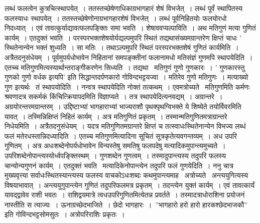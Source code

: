 \documentclass[11pt, openany]{book}
\begin{document}
\newpage
\thispagestyle{fancy}
\fancyhf{}
\noindent
लब्धं फलत्वेन कुत्रचित्स्थापयेत्~। ततस्तच्छेषेणाधिकाग्रभागहारं शेषं विभजेत्~। लब्धं पूर्वं स्थापितस्य फलस्याधः स्थापयेत्~। ततस्तच्छेषेणोनाग्रभागहारशेषं विभजेत्~। लब्धं पूर्वनिहितयोः फलयोरधो निदध्यात्~। एवं तावत्कुर्याद्यावत्फलपङ्क्तिः समा भवति~। शेषाववप्यल्पाविति~। अथ मतिगुणं मत्या गुणितं कार्यम्~। एतदुक्तं भवति~। परस्परभक्तशेषयोर्यद्यल्पमुपरि स्थितं तद्यथासंख्यमग्रान्तरेण क्षिप्तं चाधः ' स्थितेनान्येन भक्तं शुध्यति~। सा मतिः~। तथाऽल्पमुपरि स्थितं परस्परभक्तशेषं गुणितं कार्यमिति~। अत्रैतदनुसंधेयम्~। पूर्वमुपर्यधोभावेन निहितानां समपङ्क्तीनां फलानामधो मतिसंज्ञं गुणमपि स्थापयेदिति~। एतच्च मतिगुणमित्यस्यार्थान्तराङ्गीकरणेन सिध्यति~। तद्यथा \textendash \ मतिगुणं गुणो गुणकारः~। ' गुणकारस्तु गुणको गुणो वर्धक इत्यपि' इति सिद्धान्तदर्पणकारो गोविन्दभट्टयज्वा~। मतिरेव गुणो मतिगुणः~। मत्याख्यो गुण इत्यर्थः \textendash\  तं स्थापयोदिति~। नन्वत्र स्थापयेदिति नोक्तं तत्कथम्~। एवमत्रोच्यते \textendash\  मतिगुणमिति कर्मणः श्रवणादत्र सकर्मकं किंचित्क्रियापदमिति विज्ञाप्यते~। तत्र स्थापयेदित्यनवद्यम्~। अग्रान्तरे~। अग्रयोरन्तरमग्रान्तरम्~। उद्दिष्टाभ्यां भागहाराभ्यां भाज्यराशौ पृथक्पृथग्विभक्ते ये शिष्येते तयोर्विवरमिति यावत्~। तस्मिन्निक्षिप्तं निहितं कार्यम्~। अत्र मतिगुणितं प्रकृतम्~। तस्मान्मतिगुणितमत्राग्रान्तरे निधेयमिति~। अत्रैतदनुसंधेयम्~। यदत्र मतिगुणितमग्रान्तरे क्षिप्तं च तत्स्वाधःस्थितेनान्येन विभज्य लब्धं फलं मतेरधस्तान्निदध्यादिति~। एतच्च मतिगुणमित्यादिना सूचितं सूत्रकृतेत्यवगन्तव्यम्~। अध उपरि गुणितम्~। अत्र अधःशब्देनोपर्यधोभावेन विन्यस्तेषु समतिषु फलपदेषु मत्यादिकमुपान्त्यमुच्यते~। उपरिशब्देनोपान्त्यस्योर्ध्वपङ्क्तिस्थम्~। गुणशब्देन गुणत्वम्~। तस्मादुपान्त्यस्य तदुपरि फलस्य चान्योन्यगुणनं कार्यम्~। एतदुक्तं भवति \textendash\ मत्यादिकेनोपान्त्येन तदुपरि फलं गुणयेदिति~। ननु चात्र मुख्यवृत्त्या सर्वाधःस्थितस्यान्त्यस्य फलस्य वाचकोऽधःशब्दः कथमुपान्त्यमाह \textendash\ अत्रोच्यते \textendash\ अन्त्ययुगित्यस्य विषयाभावात्~। अन्त्ययुगुपान्त्येन गुणितं तदुपरिफलमत्र प्रकृतम्~। तदन्त्येन युक्तं कार्यम्~। एवं तावत्कार्यं यावद्द्वावेव राशी भवतः~। राशिद्वयमात्रे त्वधउपरिगुणितमित्येतन्न प्रवर्तते~। तस्मादत्राधोराशिना प्रयोजनं नास्तीति स त्याज्यः~। ऊनाग्रच्छेदभाजिते~। छेदो भागहारः~।~''भागहारो हरो हारो हारकश्छेदभाजकौ'' इति गोविन्दभट्टसोमसुतः~। अत्रोपरिराशिः प्रकृतः~।
\end{document}
